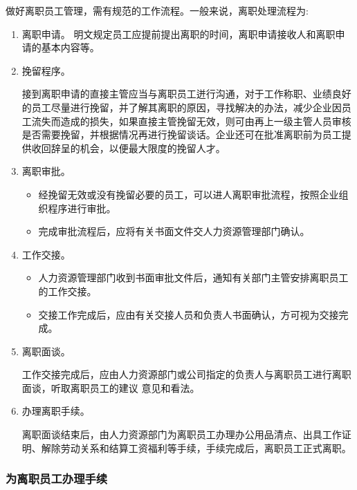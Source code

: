     做好离职员工管理，需有规范的工作流程。一般来说，离职处理流程为:
    \begin{enumerate}
        \item 离职申请。
        明文规定员工应提前提出离职的时间，离职申请接收人和离职申请的基本内容等。

        \item 挽留程序。

        接到离职申请的直接主管应当与离职员工迸行沟通，对于工作称职、业绩良好的员工尽量进行挽留，并了解其离职的原因，寻找解决的办法，减少企业因员工流失而造成的损失，如果直接主管挽留无效，则可由再上一级主管人员审核是否需要挽留，并根据情况再进行挽留谈话。企业还可在批准离职前为员工提供收回辞呈的机会，以便最大限度的挽留人才。

        \item 离职审批。
            \begin{itemize}
                \item 经挽留无效或没有挽留必要的员工，可以进人离职审批流程，按照企业组织程序进行审批。

                \item 完成审批流程后，应将有关书面文件交人力资源管理部门确认。
            \end{itemize}

        \item 工作交接。

            \begin{itemize}
                \item 人力资源管理部门收到书面审批文件后，通知有关部门主管安排离职员工的工作交接。

                \item 交接工作完成后，应由有关交接人员和负责人书面确认，方可视为交接完成。
            \end{itemize}

        \item 离职面谈。

        工作交接完成后，应由人力资源部门或公司指定的负责人与离职员工进行离职面谈，听取离职员工的建议 意见和看法。

        \item 办理离职手续。

        离职面谈结束后，由人力资源部门为离职员工办理办公用品清点、出具工作证明、解除劳动关系和结算工资福利等手续，手续完成后，离职员工正式离职。

    \end{enumerate}

\subsubsection {为离职员工办理手续}

